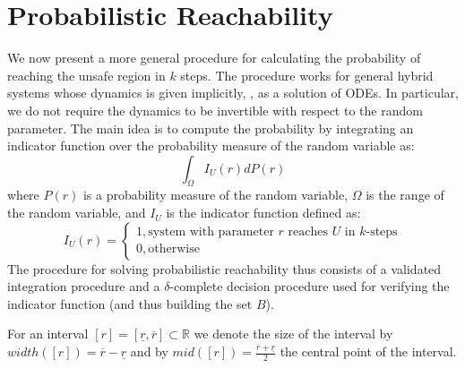 \section{Probabilistic Reachability}
We now present a more general procedure for calculating the probability of reaching 
the unsafe region in $k$ steps. The procedure works for general hybrid systems
whose dynamics is given implicitly, \eg, as a solution of ODEs. In particular, we do not
require the dynamics to be invertible with respect to the random parameter. The main idea 
is to compute the probability by integrating an indicator function over the probability measure 
of the random variable as:
\begin{equation*}
\int_{\Omega} I_{U}(r)dP(r)
\end{equation*}
where $P(r)$ is a probability measure of the random variable, $\Omega$ is the range of the 
random variable, and $I_{U}$ is the indicator function defined as:
\begin{equation*}
        I_{U}(r) = 
        \begin{cases}
                1, \text{system with parameter $r$ reaches $U$ in $k$-steps} \\
                0, \text{otherwise}
        \end{cases}
\end{equation*}
The procedure for solving probabilistic reachability thus consists of a validated integration 
procedure and a $\delta$-complete decision procedure used for verifying the indicator function
(and thus building the set $B$).

For an interval $[r]=[\underline{r}, \overline{r}] \subset \mathbb{R}$ we denote the size of
the interval by $width([r]) = \overline{r} - \underline{r}$ and by                         
$mid([r]) = \frac{\overline{r} + \underline{r}}{2}$ the central point of the interval.


